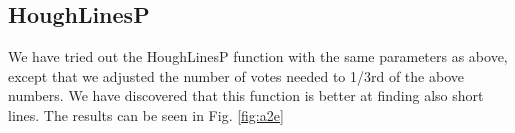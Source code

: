 \documentclass[11pt,a4paper]{article}
\begin{document}
\subsection{HoughLinesP}
We have tried out the HoughLinesP function with the same parameters as above, except that we adjusted the number of votes needed to 1/3rd of the above numbers. We have discovered that this function is better at finding also short lines. The results can be seen in Fig. \ref{fig:a2e}

\begin{figure}%
\centering
{}
\quad
{}
\quad
{}

\end{figure}
\end{document}
